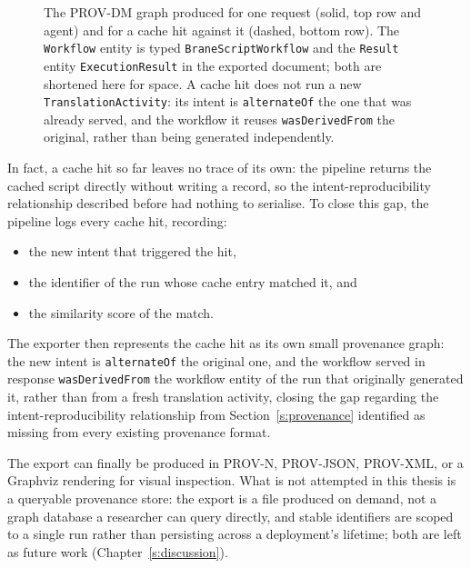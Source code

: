 \begin{figure}[htbp]
{}
    \caption[PROV-DM graph for a single pipeline request]{The PROV-DM graph produced for one request (solid, top row and
        agent) and for a cache hit against it (dashed, bottom row). The
        \texttt{Workflow} entity is typed \texttt{BraneScriptWorkflow} and
        the \texttt{Result} entity \texttt{ExecutionResult} in the exported
        document; both are shortened here for space. A cache hit does not
        run a new \texttt{TranslationActivity}: its intent is
        \texttt{alternateOf} the one that was already served, and the
        workflow it reuses \texttt{wasDerivedFrom} the original, rather than
        being generated independently.}
    \label{fig:intent-provenance}
\end{figure}

In fact, a cache hit so far leaves no trace of its own: the pipeline returns the
cached script directly without writing a record, so the
intent-reproducibility relationship described before
had nothing to serialise. To close this gap, the pipeline logs every cache hit, recording:

\begin{itemize}
    \item the new intent that triggered the hit,
    \item the identifier of the run whose cache entry matched it, and
    \item the similarity score of the match.
\end{itemize}

The exporter then represents the cache hit as its own small provenance
graph: the new intent is \texttt{alternateOf} the original one, and the
workflow served in response \texttt{wasDerivedFrom} the workflow entity of
the run that originally generated it, rather than from a fresh translation
activity, closing the gap regarding the intent-reproducibility relationship from
Section~\ref{s:provenance} identified as missing from every existing
provenance format.

The export can finally be produced in PROV-N, PROV-JSON, PROV-XML, or a 
Graphviz rendering for visual inspection. What is not
attempted in this thesis is a queryable provenance store: the export is a
file produced on demand, not a graph database a researcher can query
directly, and stable identifiers are scoped to a single run rather than
persisting across a deployment's lifetime; both are left as future work
(Chapter~\ref{s:discussion}).

